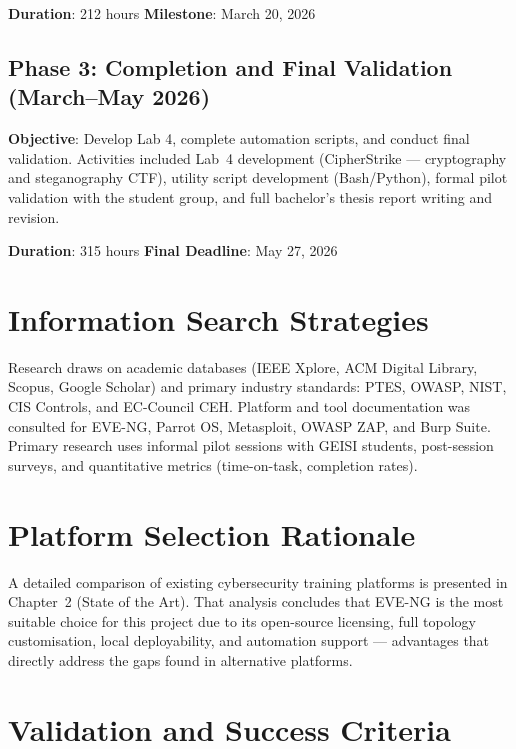 \textbf{Duration}: 212 hours \quad \textbf{Milestone}: March 20, 2026

\subsection{Phase 3: Completion and Final Validation (March--May 2026)}

\textbf{Objective}: Develop Lab 4, complete automation scripts, and conduct final validation.
Activities included Lab~4 development (CipherStrike --- cryptography and steganography CTF), utility script
development (Bash/Python), formal pilot validation with the student group, and full
bachelor's thesis report writing and revision.

\textbf{Duration}: 315 hours \quad \textbf{Final Deadline}: May 27, 2026

\section{Information Search Strategies}

Research draws on academic databases (IEEE Xplore, ACM Digital Library, Scopus, Google Scholar)
and primary industry standards: PTES\cite{ptes}, OWASP\cite{owasp_testing_guide},
NIST\cite{nist_framework,nist_sp800115}, CIS Controls\cite{cis_controls}, and
EC-Council CEH\cite{ceh_framework}. Platform and tool documentation was consulted for
EVE-NG\cite{eve_ng_docs}, Parrot OS\cite{parrot_os}, Metasploit\cite{metasploit},
OWASP ZAP\cite{owasp_zap}, and Burp Suite\cite{burp_suite}. Primary research uses informal
pilot sessions with GEISI students, post-session surveys, and quantitative metrics
(time-on-task, completion rates).

\section{Platform Selection Rationale}

A detailed comparison of existing cybersecurity training platforms is presented in
Chapter~2 (State of the Art). That analysis concludes that EVE-NG is the most suitable
choice for this project due to its open-source licensing, full topology customisation,
local deployability, and automation support --- advantages that directly address the gaps
found in alternative platforms.

\section{Validation and Success Criteria}

